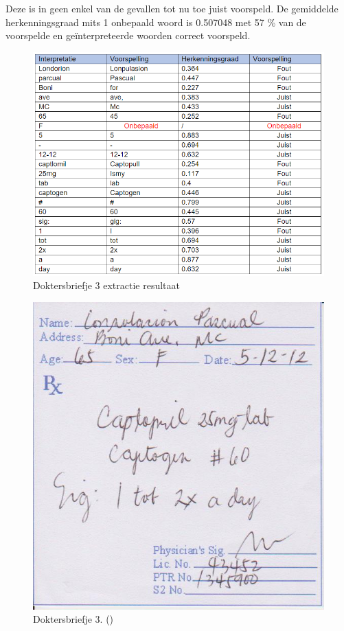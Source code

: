 Deze is in geen enkel van de gevallen tot nu toe juist voorspeld. De gemiddelde herkenningsgraad mits 1 onbepaald woord is 0.507048 met 57 \% van de voorspelde en geïnterpreteerde woorden correct voorspeld. 
\begin{figure}[h]
	
	\includegraphics[width=\textwidth,height=\textheight,keepaspectratio]{../Foto's/doktersbriefje3_tabel}
	\captionsetup{justification=centering,margin=2cm}
	\caption{Doktersbriefje 3 extractie resultaat}
	\centering
\end{figure}
\clearpage
\begin{figure}
	
	\includegraphics[width=\textwidth,height=\textheight,keepaspectratio]{../doktersbriefjes/dokterbriefje_3.jpg}
		\captionsetup{justification=centering,margin=2cm}
	\caption{Doktersbriefje 3. (\cite{Tacio2013})}
	\centering
\end{figure}
\clearpage

